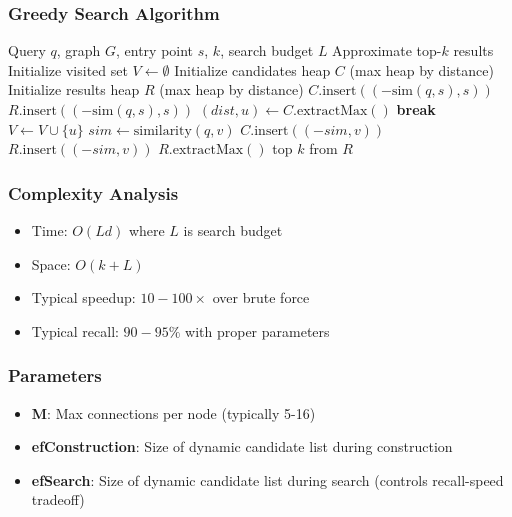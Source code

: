 \documentclass[12pt,a4paper]{article}
\begin{document}
\subsubsection{Greedy Search Algorithm}
\begin{algorithm}
\caption{Graph-Based ANN Search}
\begin{algorithmic}[1]
\Require Query $q$, graph $G$, entry point $s$, $k$, search budget $L$
\Ensure Approximate top-$k$ results
\State Initialize visited set $V \gets \emptyset$
\State Initialize candidates heap $C$ (max heap by distance)
\State Initialize results heap $R$ (max heap by distance)
\State $C.\text{insert}((- \text{sim}(q, s), s))$
\State $R.\text{insert}((- \text{sim}(q, s), s))$
    \State $(dist, u) \gets C.\text{extractMax}()$
        \State \textbf{break} 
    \EndIf
    \State $V \gets V \cup \{u\}$
            \State $sim \gets \text{similarity}(q, v)$
                \State $C.\text{insert}((-sim, v))$
                \State $R.\text{insert}((-sim, v))$
                    \State $R.\text{extractMax}()$
                \EndIf
            \EndIf
        \EndIf
    \EndFor
\EndWhile
\State \Return top $k$ from $R$
\end{algorithmic}
\end{algorithm}

\subsubsection{Complexity Analysis}
\begin{itemize}
    \item Time: $O(Ld)$ where $L$ is search budget
    \item Space: $O(k + L)$
    \item Typical speedup: $10-100\times$ over brute force
    \item Typical recall: $90-95\%$ with proper parameters
\end{itemize}

\subsubsection{Parameters}
\begin{itemize}
    \item \textbf{M}: Max connections per node (typically 5-16)
    \item \textbf{efConstruction}: Size of dynamic candidate list during construction
    \item \textbf{efSearch}: Size of dynamic candidate list during search (controls recall-speed tradeoff)
\end{itemize}
\end{document}
